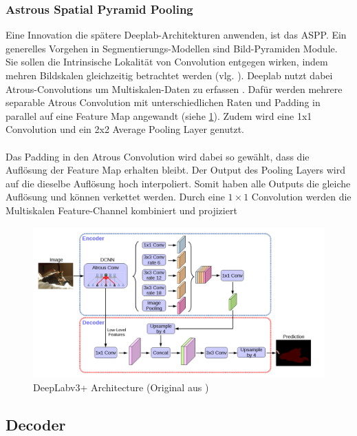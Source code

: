 \documentclass[12pt,DIV=15,BCOR=15mm,twoside,headsepline,abstract=true,listof=totoc,bibliography=totoc]{scrreprt}
\theoremstyle{remark}    %
\begin{document}
    \subsubsection{Astrous Spatial Pyramid Pooling}
    Eine Innovation die spätere Deeplab-Architekturen anwenden, ist das \ac{ASPP}. Ein generelles Vorgehen in Segmentierungs-Modellen sind
    Bild-Pyramiden Module. Sie sollen die Intrinsische Lokalität von Convolution entgegen wirken, indem mehren Bildskalen gleichzeitig betrachtet werden
    (vlg. \cite{csurka2023semanticimagesegmentationdecades}). 
    Deeplab nutzt dabei Atrous-Convolutions um Multiskalen-Daten zu erfassen \cite{chen2017rethinkingatrousconvolutionsemantic}. Dafür werden
    mehrere separable Atrous Convolution mit unterschiedlichen Raten und Padding in parallel auf eine Feature Map angewandt (siehe \ref{fig:deeplabv3plus}). 
    Zudem wird eine 1x1 Convolution und ein 2x2 Average Pooling Layer genutzt. \\\\
    Das Padding in den Atrous Convolution wird dabei so gewählt, dass die Auflösung der Feature Map erhalten bleibt.
    Der Output des Pooling Layers wird auf die dieselbe Auflösung hoch interpoliert. Somit haben alle Outputs 
    die gleiche Auflösung und können verkettet werden. Durch eine $1\times 1$ Convolution werden die Multiskalen Feature-Channel
    kombiniert und projiziert \cite{chen2017rethinkingatrousconvolutionsemantic}

    \begin{figure}[ht]
        \centering
        \includegraphics[width=0.9\linewidth]{pics/Arc.png}
        \caption{DeepLabv3+ Architecture (Original aus \cite{chen2018encoderdecoderatrousseparableconvolution})}
        \label{fig:deeplabv3plus}
    \end{figure}

    \subsection{Decoder} 
\end{document}
